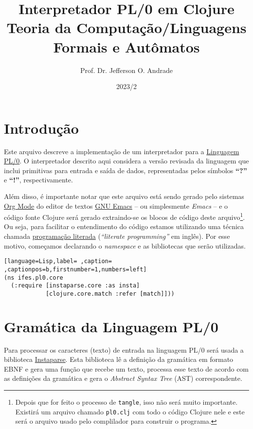 \documentclass{scrartcl}
\author{Prof. Dr. Jefferson O. Andrade}
\date{2023/2}
\title{Interpretador PL/0 em Clojure\\\medskip
\large Teoria da Computação/Linguagens Formais e Autômatos}
\begin{document}
\maketitle


\section{Introdução}
\label{sec:org4b57d08}

Este arquivo descreve a implementação de um interpretador para a \href{https://en.wikipedia.org/wiki/PL/0}{Linguagem PL/0}.
O interpretador descrito aqui considera a versão revisada da linguagem que
inclui primitivas para entrada e saída de dados, representadas pelos símbolos
\textbf{“?”} e \textbf{“!”}, respectivamente.

Além disso, é importante notar que este arquivo está sendo gerado pelo sistemas
\href{https://orgmode.org/}{Org Mode} do editor de textos \href{https://www.gnu.org/software/emacs/}{GNU Emacs} -- ou simplesmente \emph{Emacs} -- e o código
fonte Clojure será gerado extraindo-se os blocos de código deste arquivo\footnote{Depois que for feito o processo de \texttt{tangle}, isso não será muito
importante. Existirá um arquivo chamado \texttt{pl0.clj} com todo o código Clojure nele
e este será o arquivo usado pelo complilador para construir o programa.}.
Ou seja, para facilitar o entendimento do código estamos utilizando uma técnica
chamada \href{https://en.wikipedia.org/wiki/Literate\_programming}{programação literada} (\emph{“literate programming”} em inglês). Por esse
motivo, começamos declarando o \emph{namespace} e as bibliotecas que serão
utilizadas.

\begin{lstlisting}[language=Lisp,label= ,caption= ,captionpos=b,firstnumber=1,numbers=left]
(ns ifes.pl0.core
  (:require [instaparse.core :as insta]
            [clojure.core.match :refer [match]]))
\end{lstlisting}


\section{Gramática da Linguagem PL/0}
\label{sec:org7fe97bb}

Para processar os caracteres (texto) de entrada na linguagem PL/0 será usada a
biblioteca \href{https://github.com/Engelberg/instaparse}{Instaparse}. Esta biblioteca lê a definição da gramática em formato
EBNF e gera uma função que recebe um texto, processa esse texto de acordo com as
definições da gramática e gera o \emph{Abstract Syntax Tree} (AST) correspondente.
\end{document}
